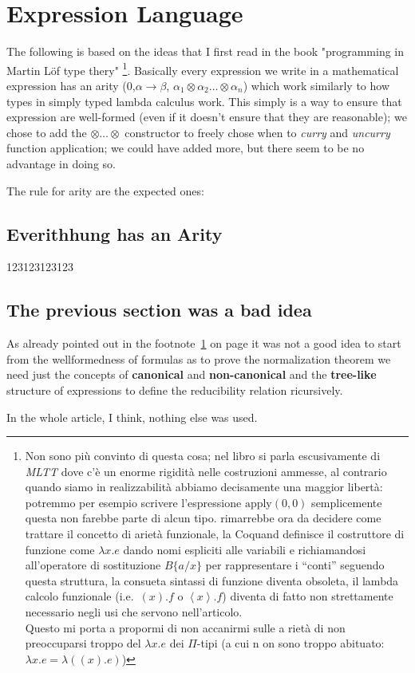 \documentclass[11pt,a5paper,draft,oneside]{amsbook}
\theoremstyle{plain}%
\theoremstyle{definition}
\theoremstyle{remark}
\newcommand{\femph}{\textbf}
\begin{document}
\chapter{Expression Language}
	The following is based on the ideas that I first read in the book "programming in Martin Löf type thery" 
	\footnote{\label{qwe13}Non sono più convinto di questa cosa; nel libro si parla escusivamente di \emph{MLTT} dove c'è un enorme rigidità nelle costruzioni ammesse, al contrario quando siamo in realizzabilità abbiamo decisamente una maggior libertà: potremmo per esempio scrivere l'espressione $\text{apply}(0,0)$ semplicemente questa non farebbe parte di alcun tipo.
	rimarrebbe ora da decidere come trattare il concetto di arietà funzionale, la Coquand definisce il costruttore di funzione come $\lambda x . e$ dando nomi espliciti alle variabili e richiamandosi all'operatore di sostituzione $B\{a/x\}$ per rappresentare i ``conti'' seguendo questa struttura, la consueta sintassi di funzione diventa obsoleta, il lambda calcolo funzionale (i.e.\ $(x).f$ o $\left\langle x\right\rangle.f$) diventa di fatto non strettamente necessario negli usi che servono nell'articolo. \\
	Questo mi porta a propormi di non accanirmi sulle a
	rietà di non preoccuparsi troppo del $\lambda x.e$ dei $\Pi$-tipi (a cui n
	on sono troppo abituato: $\lambda x.e 
	= \lambda ((x).e)$) 
	}. 
	Basically every expression we write in a mathematical expression has an arity (0,$\alpha\rightarrow\beta$, $\alpha_1\otimes\alpha_2\ldots\otimes\alpha_n$) which work similarly to how types in simply typed lambda calculus work. 
	This simply is a way to ensure that expression are well-formed (even if it doesn't ensure that they are reasonable); we chose to add the $\otimes\ldots\otimes$ constructor to freely chose when to \emph{curry} and \emph{uncurry} function application; we could have added more, but there seem to be no advantage in doing so.
	
	The rule for arity are the expected ones:
	
	\section{Everithhung has an Arity} 
		123123123123
	\section{The previous section was a bad idea}
		As already pointed out in the footnote~\ref{qwe13} on page \pageref{qwe13} it was not a good idea to start from the wellformedness of formulas as to prove the normalization theorem we need just the concepts of \femph{canonical} 
		and \femph{non-canonical} and the \femph{tree-like} structure of expressions to define the reducibility relation ricursively.
		
		In the whole article, I think, nothing else was used.
		
\end{document}
